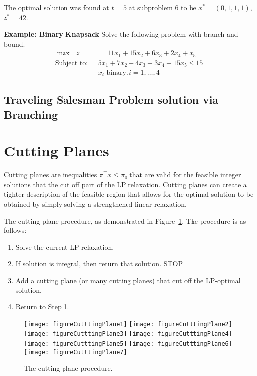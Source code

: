 \documentclass[../open-optimization/open-optimization.tex]{subfiles}
\begin{document}
The optimal solution was found at $t=5$ at subproblem 6 to be $x^* = (0,1,1,1)$, $z^* = 42$.



\textbf{Example: Binary Knapsack}
Solve the following problem with branch and bound.
\begin{align*}
\max\ \ \   z&=11x_1+15x_2+6x_3+2x_4 + x_5\\
\text{Subject to:} \ \ \ 	 &5x_1+7x_2+4x_3+3x_4 + 15x_5\leq15\\
		&x_i  \text{  binary},i=1,\dots,4
\end{align*}




\subsection{Traveling Salesman Problem solution via Branching}





\section{Cutting Planes}
Cutting planes are inequalities $\pi^\top x \leq \pi_0$ that are valid for the feasible integer solutions that the cut off part of the LP relaxation.  Cutting planes can create a tighter description of the feasible region that allows for the optimal solution to be obtained by simply solving a strengthened linear relaxation. 

The cutting plane procedure, as demonstrated in Figure~\ref{fig:cutting-plane-procudure}.  The procedure is as follows:
\begin{enumerate}
\item Solve the current LP relaxation.
\item If solution is integral, then return that solution.  STOP
\item Add a cutting plane (or many cutting planes) that cut off the LP-optimal solution.
\item Return to Step 1.
\end{enumerate}

\begin{figure}[H]
\texttt{[image: figureCutttingPlane1]}
\texttt{[image: figureCutttingPlane2]}
\texttt{[image: figureCutttingPlane3]}
\texttt{[image: figureCutttingPlane4]}
\texttt{[image: figureCutttingPlane5]}
\texttt{[image: figureCutttingPlane6]}
\texttt{[image: figureCutttingPlane7]}
\caption{The cutting plane procedure.}
\label{fig:cutting-plane-procudure}
\end{figure}
\end{document}
